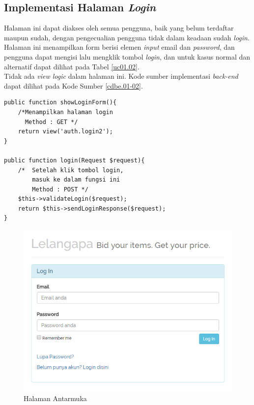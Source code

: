 \subsection{Implementasi Halaman \textit{Login}}
Halaman ini dapat diakses oleh semua pengguna, baik yang belum terdaftar maupun sudah, dengan pengecualian pengguna tidak dalam keadaan sudah \textit{login}. Halaman ini menampilkan form berisi elemen \textit{input} email dan \textit{password}, dan pengguna dapat mengisi lalu mengklik tombol \textit{login}, dan untuk kasus normal dan alternatif dapat dilihat pada Tabel \ref{uc01.02}.\\
\indent Tidak ada \textit{view logic} dalam halaman ini. Kode sumber implementasi \textit{back-end} dapat dilihat pada Kode Sumber \ref{cdbe.01-02}.

\begin{lstlisting}[label=cdbe.01-02,style=php,caption=Kode Sumber Antarmuka Registrasi]
public function showLoginForm(){
	/*Menampilkan halaman login
	  Method : GET */
	return view('auth.login2');
}

public function login(Request $request){
	/*	Setelah klik tombol login,
		masuk ke dalam fungsi ini
		Method : POST */
	$this->validateLogin($request);
	return $this->sendLoginResponse($request);
}

\end{lstlisting}

\begin{figure}[H]
	\centering
	\includegraphics[width=\textwidth]{images/bab4/ui/01-02.png}
	\caption{Halaman Antarmuka }
	\label{ui.01-01}
\end{figure}

